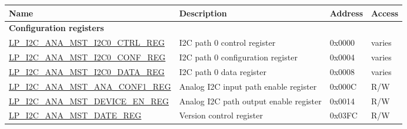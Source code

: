 \begin{longtable}{ | p{6cm} | p{7.2cm} | p{1.3cm} | p{1cm} | }
\hline\rowcolor{lightgray}
\textbf{Name} & \textbf{Description} &  \textbf{Address} & \textbf{Access} \\ \hline
\endhead
\multicolumn{4}{|l|}{\textbf{Configuration registers}} \\ \hline
\hyperref[regdesc:LPI2CANAMSTI2C0CTRLREG]{LP\_I2C\_ANA\_MST\_I2C0\_CTRL\_REG} & I2C path 0 control register & 0x0000 & varies \\ \hline
\hyperref[regdesc:LPI2CANAMSTI2C0CONFREG]{LP\_I2C\_ANA\_MST\_I2C0\_CONF\_REG} & I2C path 0 configuration register & 0x0004 & varies \\ \hline
\hyperref[regdesc:LPI2CANAMSTI2C0DATAREG]{LP\_I2C\_ANA\_MST\_I2C0\_DATA\_REG} & I2C path 0 data register & 0x0008 & varies \\ \hline
\hyperref[regdesc:LPI2CANAMSTANACONF1REG]{LP\_I2C\_ANA\_MST\_ANA\_CONF1\_REG} & Analog I2C input path enable register & 0x000C & R/W \\ \hline
\hyperref[regdesc:LPI2CANAMSTDEVICEENREG]{LP\_I2C\_ANA\_MST\_DEVICE\_EN\_REG} & Analog I2C path output enable register & 0x0014 & R/W \\ \hline
\hyperref[regdesc:LPI2CANAMSTDATEREG]{LP\_I2C\_ANA\_MST\_DATE\_REG} & Version control register & 0x03FC & R/W \\ \hline
\end{longtable}


